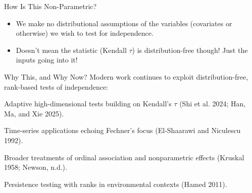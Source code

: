 \documentclass[
  ignorenonframetext,
]{beamer}
\begin{document}
\begin{frame}{How Is This Non-Parametric?}
\label{how-is-this-non-parametric}
\begin{itemize}
\item
  We make no distributional assumptions of the variables (covariates or
  otherwise) we wish to test for independence.
\item
  Doesn't mean the statistic (Kendall \(\tau\)) is distribution-free
  though! Just the inputs going into it!
\end{itemize}
\end{frame}

\begin{frame}{Why This, and Why Now?}
\label{why-this-and-why-now}
Modern work continues to exploit distribution-free, rank-based tests of
independence:

Adaptive high-dimensional tests building on Kendall's \(\tau\) (Shi et
al. 2024; Han, Ma, and Xie 2025).

Time-series applications echoing Fechner's focus (El-Shaarawi and
Niculescu 1992).

Broader treatments of ordinal association and nonparametric effects
(Kruskal 1958; Newson, n.d.).

Persistence testing with ranks in environmental contexts (Hamed 2011).
\end{frame}
\end{document}
